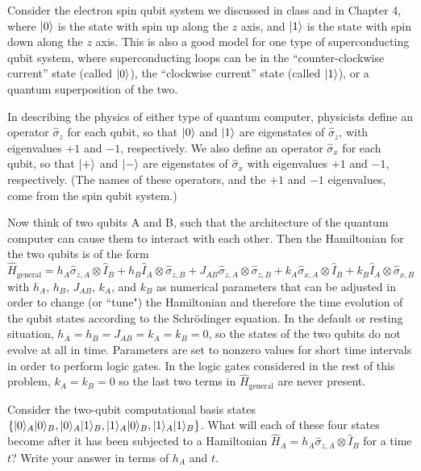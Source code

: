 \documentclass{../phys084}
\begin{document}
\begin{exercise}
  Consider the electron spin qubit system we discussed in class and in
  Chapter 4, where \(\ket 0\) is the state with spin up along the
  \(z\) axis, and \(\ket 1\) is the state with spin down along the
  \(z\) axis.  This is also a good model for one type of
  superconducting qubit system, where superconducting loops can be in
  the ``counter-clockwise current'' state (called \(\ket 0\)), the
  ``clockwise current'' state (called \(\ket 1\)), or a quantum
  superposition of the two.

  In describing the physics of either type of quantum computer,
  physicists define an operator \(\hat \sigma_z\) for each qubit, so
  that \(\ket 0\) and \(\ket 1\) are eigenstates of \(\hat \sigma_z\),
  with eigenvalues \(+1\) and \(-1\), respectively.  We also define an
  operator \(\hat \sigma_x\) for each qubit, so that \(\ket +\) and
  \(\ket -\) are eigenstates of \(\hat \sigma_x\) with eigenvalues
  \(+1\) and \(-1\), respectively.  (The names of these operators, and
  the \(+1\) and \(-1\) eigenvalues, come from the spin qubit system.)

  Now think of two qubits A and B, such that the architecture of the
  quantum computer can cause them to interact with each other.  Then
  the Hamiltonian for the two qubits is of the form
  \[
    \hat H_\text{general}
    = h_A \hat \sigma_{z,A} \otimes \hat I_B
    + h_B \hat I_A \otimes \hat \sigma_{z,B}
    + J_{AB} \hat \sigma_{z,A} \otimes \hat \sigma_{z,B}
    + k_A \hat \sigma_{x,A} \otimes \hat I_B
    + k_B \hat I_A \otimes \hat \sigma_{x,B}
  \]
  with \(h_A\), \(h_B\), \(J_{AB}\), \(k_A\), and \(k_B\) as numerical
  parameters that can be adjusted in order to change (or ``tune") the
  Hamiltonian and therefore the time evolution of the qubit states
  according to the Schr\"odinger equation.  In the default or resting
  situation, \(h_A = h_B = J_{AB} = k_A = k_B = 0\), so the states of
  the two qubits do not evolve at all in time.  Parameters are set to
  nonzero values for short time intervals in order to perform logic
  gates.  In the logic gates considered in the rest of this problem,
  \(k_A = k_B = 0\) so the last two terms in \(\hat H_\text{general}\)
  are never present.

  \begin{problems}
  \item Consider the two-qubit computational basis states
    \(\set*{\ket 0_A \ket 0_B, \ket 0_A \ket 1_B, \ket 1_A \ket 0_B,
      \ket 1_A \ket 1_B}\).  What will each of these four states
    become after it has been subjected to a Hamiltonian
    \(\hat H_A = h_A \hat \sigma_{z,A} \otimes \hat I_B\) for a time
    \(t\)?  Write your answer in terms of \(h_A\) and \(t\).


\end{problems}
\end{exercise}
\end{document}
